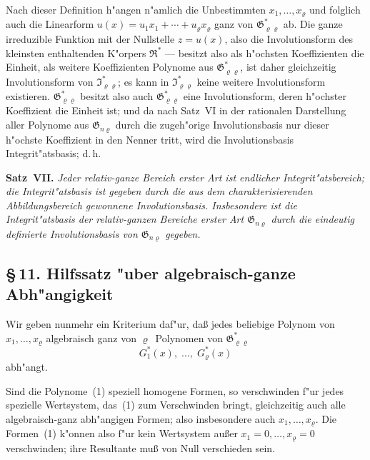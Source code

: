 \documentclass[11pt,a4paper]{article}
\begin{document}
Nach dieser Definition h"{a}ngen n"{a}mlich die Unbestimmten $x_{1},\dots,x_{\varrho}$
und folglich auch die Linearform $u(x)=u_{1}x_{1}+\cdots+u_{\varrho}x_{\varrho}$
ganz von $\mathfrak{G}_{\varrho\varrho}^{*}$ ab. Die ganze irreduzible Funktion mit der Nullstelle $z=u(x)$,
also die Involutionsform des kleinsten enthaltenden K"{o}rpers $\mathfrak{R}^{*}$ ---
besitzt also als h"{o}chsten Koeffizienten die Einheit, als weitere Koeffizienten
Polynome aus $\mathfrak{G}_{\varrho\varrho}^{*}$, ist daher gleichzeitig Involutionsform von $\mathfrak{I}_{\varrho\varrho}^{*}$; es kann in
$\mathfrak{I}_{\varrho\varrho}^{*}$ keine weitere Involutionsform existieren. $\mathfrak{G}_{\varrho\varrho}^{*}$ besitzt also auch $\mathfrak{G}_{\varrho\varrho}^{*}$
eine Involutionsform, deren h"{o}chster Koeffizient die Einheit ist; und da
nach Satz~VI in der rationalen Darstellung aller Polynome aus $\mathfrak{G}_{n\varrho}$ durch
die zugeh"{o}rige Involutionsbasis nur dieser h"{o}chste Koeffizient in den Nenner
tritt, wird die Involutionsbasis Integrit"{a}tsbasis; d.\,h.

\medskip
\noindent
\textbf{Satz~VII.} \emph{Jeder relativ-ganze Bereich erster Art ist endlicher
Integrit"{a}tsbereich; die Integrit"{a}tsbasis ist gegeben durch die aus dem
charakterisierenden Abbildungsbereich gewonnene Involutionsbasis.
Insbesondere ist die Integrit"{a}tsbasis der relativ-ganzen Bereiche erster
Art $\mathfrak{G}_{n\varrho}$ durch die eindeutig definierte Involutionsbasis von $\mathfrak{G}_{n\varrho}$ gegeben.}


\subsection*{\S\,11. Hilfssatz "{u}ber algebraisch-ganze Abh"{a}ngigkeit}

Wir geben nunmehr ein Kriterium daf"{u}r, da\ss{} jedes beliebige Polynom
von $x_{1},\dots,x_{\varrho}$ algebraisch ganz von $\varrho$~Polynomen von $\mathfrak{G}_{\varrho\varrho}^{*}$
\begin{equation}
G_{1}^{*}(x),\;\dots,\;G_{\varrho}^{*}(x)
\tag{1}
\end{equation}
abh"{a}ngt.

Sind die Polynome~(1) speziell homogene Formen, so verschwinden
f"{u}r jedes spezielle Wertsystem, das~(1) zum Verschwinden bringt, gleichzeitig
auch alle algebraisch-ganz abh"{a}ngigen Formen; also insbesondere
auch $x_{1},\dots,x_{\varrho}$. Die Formen~(1) k"{o}nnen also f"{u}r kein Wertsystem
au\ss{}er $x_{1}=0,\dots,x_{\varrho}=0$ verschwinden; ihre Resultante mu\ss{} von Null
verschieden sein.
\end{document}
